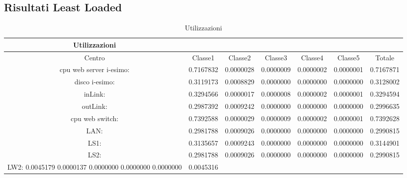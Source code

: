 \subsection{Risultati Least Loaded}
\begin{table}[htbp]
\begin{center}
\begin{tabular}{||c|c|c|c|c|c|c||}
\hline
Utilizzazioni\\
\hline
Centro &Classe1 &Classe2 &Classe3 &Classe4 &Classe5 &Totale\\
\hline
\hline
 cpu web server i-esimo: 	&0.7167832	&0.0000028	&0.0000009	&0.0000002	&0.0000001	&0.7167871\\
\hline
 disco i-esimo: 	&0.3119173	&0.0008829	&0.0000000	&0.0000000	&0.0000000	&0.3128002\\
\hline
 inLink: 	&0.3294566	&0.0000017	&0.0000008	&0.0000002	&0.0000001	&0.3294594\\
\hline
 outLink: 	&0.2987392	&0.0009242	&0.0000000	&0.0000000	&0.0000000	&0.2996635\\
\hline
 cpu web switch: 	&0.7392588	&0.0000029	&0.0000009	&0.0000002	&0.0000001	&0.7392628\\
\hline
 LAN: 	&0.2981788	&0.0009026	&0.0000000	&0.0000000	&0.0000000	&0.2990815\\
\hline
 LS1: 	&0.3135657	&0.0009243	&0.0000000	&0.0000000	&0.0000000	&0.3144901\\
\hline
 LS2:	&0.2981788	&0.0009026	&0.0000000	&0.0000000	&0.0000000	&0.2990815\\
\hline
 LW2: 	0.0045179	0.0000137	0.0000000	0.0000000	0.0000000	&0.0045316\\
\hline
\end{tabular}
\end{center}
\caption{Utilizzazioni}
\label{utilizzazioni}
\end{table}

